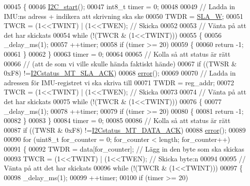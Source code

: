 \begin{DoxyCode}
00045 \{
00046     \hyperlink{_i2_c_8c_a263c74ce484e3680c05a9118707fadb7}{I2C\_start}();
00047     int8\_t timer = 0;
00048 
00049     \textcolor{comment}{// Ladda in IMU:ns adress + indikera att skrivning ska ske}
00050     TWDR = \hyperlink{_i2_c_8h_a3df22e1e7b66be8b74b33ce077824292}{SLA\_W};  
00051     TWCR = (1<<TWINT) | (1<<TWEN);          \textcolor{comment}{// Skicka}
00052 
00053     \textcolor{comment}{// Vänta på att det har skickats}
00054     \textcolor{keywordflow}{while} (!(TWCR & (1<<TWINT)))
00055     \{
00056         \_delay\_ms(1);
00057         ++timer;
00058         \textcolor{keywordflow}{if} (timer >= 20)
00059         \{
00060             \textcolor{keywordflow}{return} -1;
00061         \}
00062     \}                   
00063     timer = 0;
00064 
00065     \textcolor{comment}{// Kolla så att status är rätt }
00066     \textcolor{comment}{// (att de som vi ville skulle hända faktiskt hände)}
00067     \textcolor{keywordflow}{if} ((TWSR & 0xF8) !=\hyperlink{_i2_c_8h_a86ef56020aa435f9af57015ee220c3e4}{I2Cstatus\_MT\_SLA\_ACK})       
00068     \hyperlink{_i2_c_8c_ad1a5ba420409525ff5ab1be86ac5e526}{error}();
00069 
00070     \textcolor{comment}{// Ladda in adressen för IMU-registret vi ska skriva till}
00071     TWDR = reg\_addr;
00072     TWCR = (1<<TWINT) | (1<<TWEN);                  \textcolor{comment}{// Skicka}
00073 
00074     \textcolor{comment}{// Vänta på att det har skickats}
00075     \textcolor{keywordflow}{while} (!(TWCR & (1<<TWINT)))
00076     \{
00077         \_delay\_ms(1);
00078         ++timer;
00079         \textcolor{keywordflow}{if} (timer >= 20)
00080         \{
00081             \textcolor{keywordflow}{return} -1;
00082         \}
00083     \}                   
00084     timer = 0;
00085 
00086     \textcolor{comment}{// Kolla så att status är rätt}
00087     \textcolor{keywordflow}{if} ((TWSR & 0xF8) !=\hyperlink{_i2_c_8h_a083e480a49a539cd4740d0e1a15216f3}{I2Cstatus\_MT\_DATA\_ACK})     
00088     \hyperlink{_i2_c_8c_ad1a5ba420409525ff5ab1be86ac5e526}{error}();
00089 
00090     \textcolor{keywordflow}{for} (uint8\_t for\_counter = 0; for\_counter < length; for\_counter++)
00091     \{
00092         TWDR = data[for\_counter];           \textcolor{comment}{// Lägg in den byte som ska skickas}
00093         TWCR = (1<<TWINT) | (1<<TWEN);      \textcolor{comment}{// Skicka byte:n}
00094 
00095         \textcolor{comment}{// Vänta på att det har skickats}
00096         \textcolor{keywordflow}{while} (!(TWCR & (1<<TWINT)))
00097         \{
00098             \_delay\_ms(1);
00099             ++timer;
00100             \textcolor{keywordflow}{if} (timer >= 20)

\end{DoxyCode}
